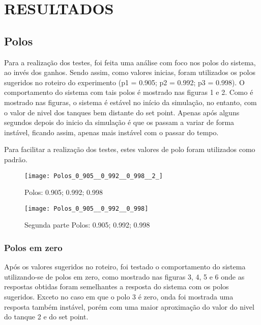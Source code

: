 \documentclass[a4paper,12pt]{article}
\begin{document}
\newpage


\thispagestyle{main}

\section{RESULTADOS}

\subsection{Polos}

\hspace{4ex}Para a realização dos testes, foi feita uma análise com foco nos polos do sistema, ao invés dos ganhos. Sendo assim, como valores inicias, foram utilizados os polos sugeridos no roteiro do experimento (p1 = 0.905; p2 = 0.992; p3 = 0.998). O comportamento do sistema com tais polos é mostrado nas figuras 1 e 2. Como é mostrado nas figuras, o sistema é estável no início da simulação, no entanto, com o valor de nivel dos tanques bem distante do set point. Apenas após alguns segundos depois do inicio da simulação é que os passam a variar de forma instável, ficando assim, apenas mais instável com o passar do tempo.

Para facilitar a realização dos testes, estes valores de polo foram utilizados como padrão.

\begin{figure}[h!]
\texttt{[image: Polos\_0\_905\_\_0\_992\_\_0\_998\_\_2\_]}
\caption{Polos: 0.905; 0.992; 0.998}
\end{figure}

\begin{figure}[h!]
\texttt{[image: Polos\_0\_905\_\_0\_992\_\_0\_998]}
\caption{Segunda parte Polos: 0.905; 0.992; 0.998}
\end{figure}

\newpage

\thispagestyle{main}

\subsubsection{Polos em zero}

\hspace{4ex}Após os valores sugeridos no roteiro, foi testado o comportamento do sistema utilizando-se de polos em zero, como mostrado nas figuras 3, 4, 5 e 6 onde as respostas obtidas foram semelhantes a resposta do sistema com os polos sugeridos. Exceto no caso em que o polo 3 é zero, onda foi mostrada uma resposta também instável, porém com uma maior aproximação do valor do nivel do tanque 2 e do set point.
\end{document}
